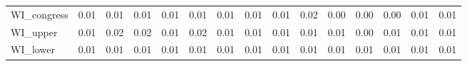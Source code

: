 \begin{tabular}{lrrrrrrrrrrrrrr}
WI\_congress &   0.01 &           0.01 &       0.01 &       0.01 &            0.01 &         0.01 &           0.01 &                   0.01 &            0.02 &       0.00 &          0.00 &           0.00 &           0.01 &            0.01 \\
WI\_upper    &   0.01 &           0.02 &       0.02 &       0.01 &            0.02 &         0.01 &           0.01 &                   0.01 &            0.01 &       0.01 &          0.00 &           0.01 &           0.01 &            0.01 \\
WI\_lower    &   0.01 &           0.01 &       0.01 &       0.01 &            0.01 &         0.01 &           0.01 &                   0.01 &            0.01 &       0.01 &          0.01 &           0.01 &           0.01 &            0.01 \\
\bottomrule
\end{tabular}
